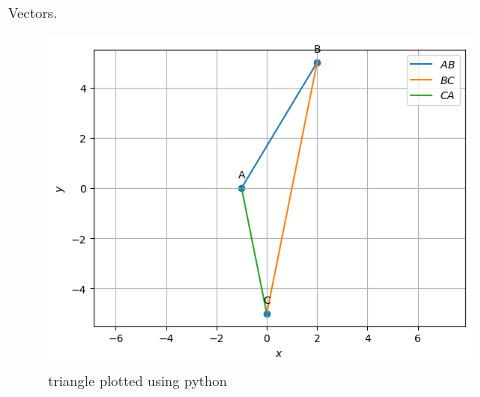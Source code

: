 \begin{table}[H]
        \centering
        
        \caption{Vectors.}
        \label{tab:Vectors}
    \end{table}
\begin{figure}[H]
\includegraphics[width=\columnwidth]{1.1/figs/Triangle.png}
\caption{triangle plotted using python}
\label{fig:i_triangle_py}
\end{figure}


